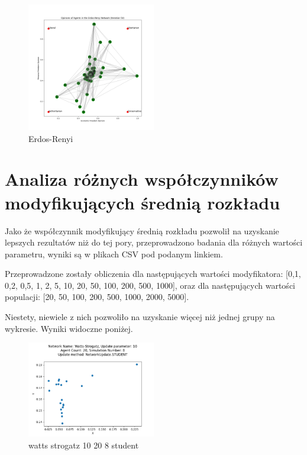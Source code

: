 \documentclass{wfiisul}
\begin{document}
\begin{figure}
  \centering
  \includegraphics[width=0.5\textwidth]{img/Erdos-Renyi.png}
  \caption{Erdos-Renyi}
  \label{fig:Erdos-Renyi}
\end{figure}


\section{Analiza różnych współczynników modyfikujących średnią rozkładu}

Jako że współczynnik modyfikujący średnią rozkładu pozwolił na uzyskanie lepszych rezultatów niż do tej pory, przeprowadzono badania dla różnych wartości parametru, wyniki są w plikach CSV pod podanym linkiem. 

Przeprowadzone zostały obliczenia dla następujących wartości modyfikatora: [0,1, 0,2, 0,5, 1, 2, 5, 10, 20, 50, 100, 200, 500, 1000], 
oraz dla następujących wartości populacji: [20, 50, 100, 200, 500, 1000, 2000, 5000]. 

Niestety, niewiele z nich pozwoliło na uzyskanie więcej niż jednej grupy na wykresie. Wyniki widoczne poniżej. 

\begin{figure}
  \centering
  \includegraphics[width=0.5\textwidth]{img/watts_strogatz_10_20_8_student.png}
  \caption{watts strogatz 10 20 8 student}
  \label{fig:watts_strogatz_10_20_8_student}
\end{figure}
\end{document}
